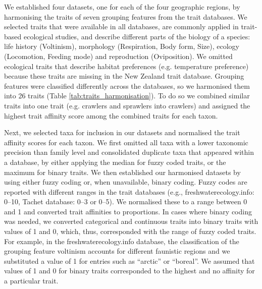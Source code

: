 \documentclass{article}
\begin{document}
We established four datasets, one for each of the four geographic regions, by harmonising the traits of seven grouping features from the trait databases. We selected traits that were available in all databases, are commonly applied in trait-based ecological studies, and describe different parts of the biology of a species: life history (Voltinism), morphology (Respiration, Body form, Size), ecology (Locomotion, Feeding mode) and reproduction (Oviposition). We omitted ecological traits that describe habitat preferences (e.g. temperature preference) because these traits are missing in the New Zealand trait database. Grouping features were  classified differently across the databases, so we harmonised them into 26 traits (Table \ref{tab:traits_harmonisation}). To do so we combined  similar traits into one trait (e.g. crawlers and sprawlers into crawlers) and assigned the highest trait affinity score among the combined traits for each taxon.  

Next, we selected taxa for inclusion in our datasets and normalised the trait affinity scores for each taxon. We first omitted all taxa with a lower taxonomic precision than family level and consolidated duplicate taxa that appeared within a database, by either applying the median for fuzzy coded traits, or the maximum for binary traits. We then established our harmonised datasets by using either fuzzy coding or, when unavailable, binary coding. Fuzzy codes are reported with different ranges in the trait databases (e.g., freshwaterecology.info: 0–10, Tachet database: 0–3 or 0–5). We normalised these to a range between 0 and 1 and converted trait affinities to proportions. In cases where binary coding was needed, we converted categorical and continuous traits into binary traits with values of 1 and 0, which, thus, corresponded with the range of fuzzy coded traits. For example, in the  freshwaterecology.info database, the classification of the grouping feature voltinism accounts for different faunistic regions and we substituted a value of 1 for entries such as “arctic” or “boreal”. We assumed that values of 1 and 0 for binary traits corresponded to the highest and no affinity for a particular trait.
\end{document}
